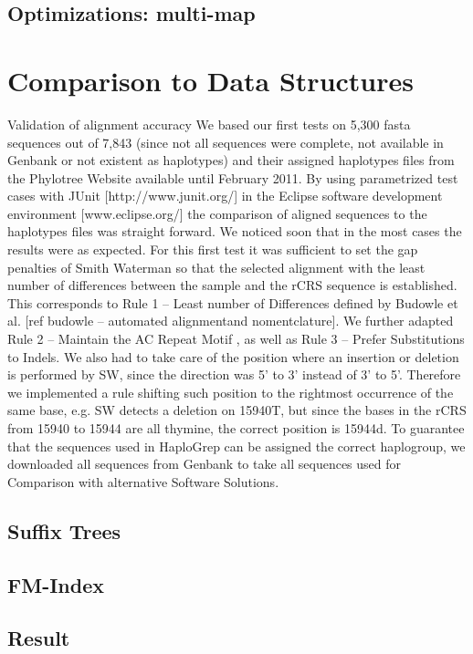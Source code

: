 \subsection{Optimizations: multi-map}\label{align:optim}
\section{Comparison to Data Structures}
Validation of alignment accuracy
We based our first tests on 5,300 fasta sequences out of 7,843 (since not all sequences were complete, not available in Genbank or not existent as haplotypes) and their assigned haplotypes files from the Phylotree Website available until February 2011. By using parametrized test cases with JUnit [http://www.junit.org/] in the Eclipse software development environment [www.eclipse.org/] the comparison of aligned sequences to the haplotypes files was straight forward. We noticed soon that in the most cases the results were as expected. For this first test it was sufficient to set the gap penalties of Smith Waterman so that the selected alignment with the least number of differences between the sample and the rCRS sequence is established. This corresponds to Rule 1 – Least number of Differences defined by Budowle et al. [ref budowle – automated alignmentand nomentclature]. We further adapted Rule 2 – Maintain the AC Repeat Motif , as well as Rule 3 – Prefer Substitutions to Indels. We also had to take care of the position where an insertion or deletion is performed by SW, since the direction was 5’ to 3’ instead of 3’ to 5’. Therefore we implemented a rule shifting such position to the rightmost occurrence of the same base, e.g. SW detects a deletion on 15940T, but since the bases in the rCRS from 15940 to 15944 are all thymine, the correct position is 15944d. To guarantee that the sequences used in HaploGrep can be assigned the correct haplogroup, we downloaded all sequences from Genbank to take all sequences used for Comparison with alternative Software Solutions.
\subsection{Suffix Trees}
\subsection{FM-Index}
\subsection{Result}
